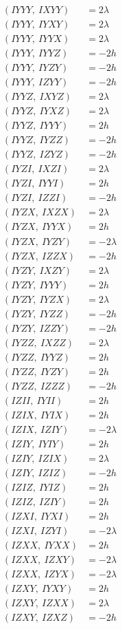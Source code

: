 \documentclass{article}
\begin{document}
\begin{align*}
  (IYYY,\ IXYY) &= 2 \lambda \\
  (IYYY,\ IYXY) &= 2 \lambda \\
  (IYYY,\ IYYX) &= 2 \lambda \\
  (IYYY,\ IYYZ) &= - 2 h \\
  (IYYY,\ IYZY) &= - 2 h \\
  (IYYY,\ IZYY) &= - 2 h \\
  (IYYZ,\ IXYZ) &= 2 \lambda \\
  (IYYZ,\ IYXZ) &= 2 \lambda \\
  (IYYZ,\ IYYY) &= 2 h \\
  (IYYZ,\ IYZZ) &= - 2 h \\
  (IYYZ,\ IZYZ) &= - 2 h \\
  (IYZI,\ IXZI) &= 2 \lambda \\
  (IYZI,\ IYYI) &= 2 h \\
  (IYZI,\ IZZI) &= - 2 h \\
  (IYZX,\ IXZX) &= 2 \lambda \\
  (IYZX,\ IYYX) &= 2 h \\
  (IYZX,\ IYZY) &= - 2 \lambda \\
  (IYZX,\ IZZX) &= - 2 h \\
  (IYZY,\ IXZY) &= 2 \lambda \\
  (IYZY,\ IYYY) &= 2 h \\
  (IYZY,\ IYZX) &= 2 \lambda \\
  (IYZY,\ IYZZ) &= - 2 h \\
  (IYZY,\ IZZY) &= - 2 h \\
  (IYZZ,\ IXZZ) &= 2 \lambda \\
  (IYZZ,\ IYYZ) &= 2 h \\
  (IYZZ,\ IYZY) &= 2 h \\
  (IYZZ,\ IZZZ) &= - 2 h \\
  (IZII,\ IYII) &= 2 h \\
  (IZIX,\ IYIX) &= 2 h \\
  (IZIX,\ IZIY) &= - 2 \lambda \\
  (IZIY,\ IYIY) &= 2 h \\
  (IZIY,\ IZIX) &= 2 \lambda \\
  (IZIY,\ IZIZ) &= - 2 h \\
  (IZIZ,\ IYIZ) &= 2 h \\
  (IZIZ,\ IZIY) &= 2 h \\
  (IZXI,\ IYXI) &= 2 h \\
  (IZXI,\ IZYI) &= - 2 \lambda \\
  (IZXX,\ IYXX) &= 2 h \\
  (IZXX,\ IZXY) &= - 2 \lambda \\
  (IZXX,\ IZYX) &= - 2 \lambda \\
  (IZXY,\ IYXY) &= 2 h \\
  (IZXY,\ IZXX) &= 2 \lambda \\
  (IZXY,\ IZXZ) &= - 2 h
\end{align*}
\end{document}
